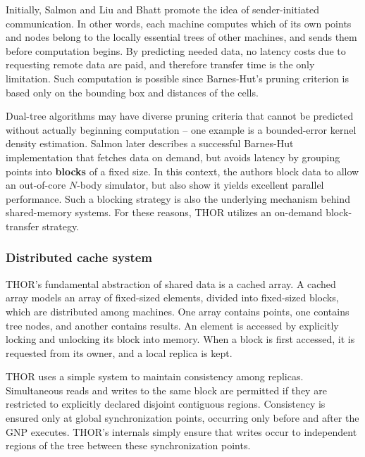 \documentclass[twoside,leqno,twocolumn]{article}
\newcommand{\authornote}[1]{\footnote{Note to self: #1}}
\newcommand{\authorsnote}[1]{\authornote{#1}}
\newcommand{\mysubsub}[1]{\subsubsection{#1} }
\newcommand{\defterm}[1]{{\bf #1}}
\begin{document}
Initially, Salmon\cite{salmon_thesis} and Liu and Bhatt\cite{liu94experiences} promote the idea of sender-initiated communication.
In other words, each machine computes which of its own points and nodes belong to the locally essential trees of other machines, and sends them before computation begins.
By predicting needed data, no latency costs due to requesting remote data are paid, and therefore transfer time is the only limitation.
Such computation is possible since Barnes-Hut's pruning criterion is based only on the bounding box and distances of the cells.

Dual-tree algorithms may have diverse pruning criteria that cannot be predicted without actually beginning computation -- one example is a bounded-error kernel density estimation\cite{gray_kde}.
Salmon later describes\cite{salmon97parallel} a successful Barnes-Hut implementation that fetches data on demand, but avoids latency by grouping points into \defterm{blocks} of a fixed size.
In this context, the authors block data to allow an out-of-core $N$-body simulator, but also show it yields excellent parallel performance.
Such a blocking strategy is also the underlying mechanism behind shared-memory systems.
For these reasons, THOR utilizes an on-demand block-transfer strategy.

\mysubsub{Distributed cache system}

THOR's fundamental abstraction of shared data is a cached array.
A cached array models an array of fixed-sized elements, divided into fixed-sized blocks, which are distributed among machines.
One array contains points, one contains tree nodes, and another contains results.
An element is accessed by explicitly locking and unlocking its block into memory.
When a block is first accessed, it is requested from its owner, and a local replica is kept.

THOR uses a simple system to maintain consistency among replicas.
Simultaneous reads and writes to the same block are permitted if they are restricted to explicitly declared disjoint contiguous regions.
Consistency is ensured only at global synchronization points, occurring only before and after the GNP executes.
THOR's internals simply ensure that writes occur to independent regions of the tree between these synchronization points.

\end{document}
